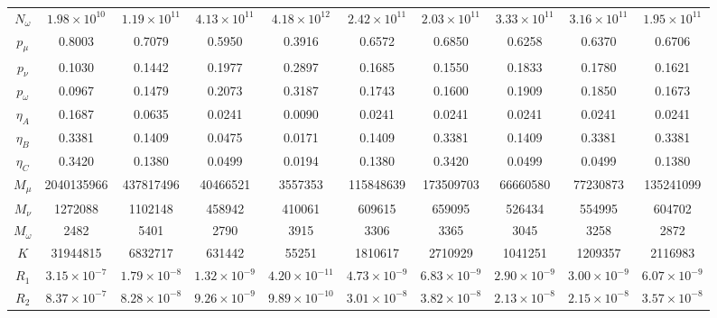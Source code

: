 \documentclass[aps,twocolumn,superscriptaddress,showpacs,nofootinbib]{revtex4-2}
\begin{document}
\begin{table}[bpth!]
{\begin{tabular}{c|cccc|ccccc}
$N_{\omega}$ & $1.98\times10^{10}$ & $1.19\times10^{11}$ & $4.13\times10^{11}$ & $4.18\times10^{12}$ & $2.42\times10^{11}$ & $2.03 \times10^{11}$ & $3.33\times10^{11}$ & $3.16\times10^{11}$ & $1.95\times10^{11}$\\
	$p_\mu$ 	& 0.8003 & 0.7079 & 0.5950 & 0.3916 & 0.6572 & 0.6850 & 0.6258 & 0.6370 & 0.6706\\
	$p_\nu$ 	& 0.1030 & 0.1442 & 0.1977 & 0.2897 & 0.1685 & 0.1550 & 0.1833 & 0.1780 & 0.1621\\
	$p_\omega$	& 0.0967 & 0.1479 &0.2073 & 0.3187 &0.1743 &0.1600 & 0.1909 & 0.1850 & 0.1673\\
	\hline
	$\eta_{A}$ 	& 0.1687 	& 0.0635 	& 0.0241 	& 0.0090 	& 0.0241 	& 0.0241 	& 0.0241 	& 0.0241 	& 0.0241\\
	$\eta_{B}$ 	& 0.3381 	& 0.1409 	& 0.0475	& 0.0171 	& 0.1409 	& 0.3381	& 0.1409 	&0.3381 	& 0.3381\\
	$\eta_{C}$ 	& 0.3420 	& 0.1380 	& 0.0499 	& 0.0194 	& 0.1380 	& 0.3420 	& 0.0499 	&0.0499 	& 0.1380\\


     \hline
$M_{\mu}$			&	2040135966 &	437817496	&	40466521	&	3557353	& 	115848639	& 	173509703	& 	66660580	&	77230873	&	135241099\\
$M_{\nu}$		& 	1272088 	& 	1102148	&	458942	&	410061	&	609615	&	659095 	&	526434	&	554995	&	604702\\
$M_{\omega}$	&	2482		&	5401		&	2790		&	3915		&	3306		&	3365		&	3045		&	3258		&	2872\\
     $K$				&	31944815 	&	6832717	&	631442	&	55251		&	1810617	&	2710929	&	1041251	&	1209357 	&	2116983\\
$R_1$ & $3.15\times10^{-7}$ & $1.79\times10^{-8}$ & $1.32\times10^{-9}$ & $4.20\times10^{-11}$ & $4.73\times10^{-9}$ & $6.83\times10^{-9}$ & $2.90\times10^{-9}$ & $3.00\times10^{-9}$ & $6.07\times10^{-9}$\\
$R_2$ & $8.37\times 10^{-7}$ & $8.28\times 10^{-8}$ & $9.26\times 10^{-9}$ & $9.89\times 10^{-10}$ & $3.01\times 10^{-8}$ & $3.82\times 10^{-8}$ & $2.13\times 10^{-8}$ & $2.15\times 10^{-8}$ & $3.57\times 10^{-8}$\\
	\hline
	\hline
	\end{tabular}}
\end{table}

\end{document}
